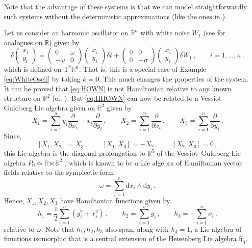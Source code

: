 \documentclass[11pt]{article}
\theoremstyle{plain}
\theoremstyle{definition}
\renewcommand{\d}{\mathrm{d}}
\newcommand{\cT}{\mathrm{T}^\ast}
\def\d{\mathrm{d}}
\begin{document}
Note that the advantage of these systems is that we can model straightforwardly such systems without the deterministic approximations (like the ones in \cite{CFH23}).

Let us consider an harmonic oscillator on $\mathbb{R}^n$ with white noise $W_1$ (see \cite{HH11,Ha19} for analogues on $\mathbb{R}$) given by
\begin{equation}\label{eq:HHOWN}
\delta\begin{pmatrix}
    x_i \\ y_i
\end{pmatrix} = \begin{pmatrix}
    0 & \omega \\ -\omega & 0
\end{pmatrix} \begin{pmatrix}
    x_i \\ y_i
\end{pmatrix} \delta t + \begin{pmatrix}
    0 & 0 \\ 0 & -\sigma
\end{pmatrix} \begin{pmatrix}
    x_i \\ y_i
\end{pmatrix} \delta W_1\,,\qquad i=1,\ldots,n\,.
\end{equation}
 which is defined on $\cT\mathbb{R}^n$. That is, this is a special case of Example \ref{eq:WhiteOscil} by taking $k=0$. This much changes the properties of the system. It can be proved that \eqref{eq:HOWN} is not Hamiltonian relative to any known structure on $\mathbb{R}^2$ (cf. \cite{LS21}). But \eqref{eq:HHOWN} can now be related to a Vessiot--Guldberg Lie algebra given  on $\mathbb{R}^2$ given by
 $$
 X_1=\sum_{i=1}^n y_i\frac{\partial}{\partial x_i}-x_i\frac{\partial}{\partial y_i}
\,,\qquad X_2=\sum_{i=1}^n\frac{\partial}{\partial x_i}\,,\qquad X_{3}=\sum_{i=1}^n\frac{\partial}{\partial y_i}\,.
 $$
 Since,
 $$
 [X_1,X_2]=X_3\,,\qquad [X_1,X_3]=-X_2\,,\qquad [X_2,X_3]=0\,,
 $$
 this Lie algebra is the diagonal prolongation to $\mathbb{R}^5$ of the Vessiot--Guldberg Lie algebra $P_0\simeq \mathbb{R}\ltimes \mathbb{R}^2$  \cite{BBHLS15,LS21}, which is known to be a Lie algebra of Hamiltonian vector fields relative to the symplectic form
 $$
 \omega=\sum_{i=1}^n\d x_i\wedge \d y_i\,.
 $$
Hence, $X_1,X_2,X_3$ have Hamiltonian functions given by
 $$
 h_1 = \frac{1}{2}\sum_{i=1}^n(y_i^2+x_i^2)\,,\qquad h_2 = \sum_{i=1}^ny_i\,,\qquad h_3=-\sum_{i=1}^nx_i\,.
 $$
 relative to $\omega$. Note that $h_1,h_2,h_3$ also span, along with $h_4=1$, a Lie algebra of functions isomorphic that is a central extension of  the Heisenberg Lie algebra  $\mathfrak{h}_3$.
 
\end{document}
